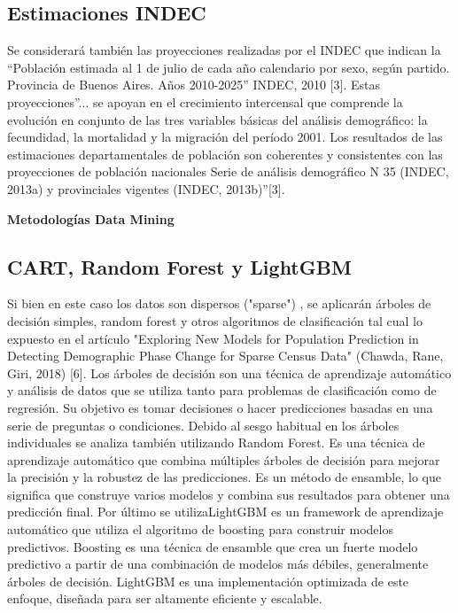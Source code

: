 \documentclass{article}
\theoremstyle{mytheoremstyle}
\theoremstyle{mytheoremstyle}
\theoremstyle{myproblemstyle}
\begin{document}
\subsection{Estimaciones INDEC}
 Se considerará también las proyecciones realizadas por el INDEC que indican la “Población estimada al 1 de julio de
 cada año calendario por sexo, según partido. Provincia de Buenos Aires. Años 2010-2025” INDEC, 2010 [3].\newline
  Estas proyecciones''... se apoyan en el crecimiento intercensal que comprende la evolución en conjunto
 de las tres variables básicas del análisis demográfico: la fecundidad, la mortalidad y la migración del período
 2001. Los resultados de las estimaciones departamentales de población son coherentes y consistentes
 con las proyecciones de población nacionales Serie de análisis demográfico N 35 (INDEC, 2013a) y
 provinciales vigentes (INDEC, 2013b)''[3].

\textbf{Metodologías Data Mining}

\subsection{CART, Random Forest  y LightGBM}
 Si bien en este caso los datos son dispersos ("sparse") , se aplicarán árboles de decisión simples, random forest y otros algoritmos de clasificación
 tal cual lo expuesto en el artículo "Exploring New Models for Population Prediction in Detecting Demographic
  Phase Change for Sparse Census Data" (Chawda, Rane, Giri, 2018) [6]. \newline
  Los árboles de decisión son una técnica de aprendizaje automático y análisis de datos que se utiliza tanto para problemas de clasificación como de regresión. Su objetivo es tomar decisiones o
  hacer predicciones basadas en una serie de preguntas o condiciones. Debido al sesgo habitual en los árboles individuales se analiza también
  utilizando Random Forest. Es una técnica de aprendizaje automático que combina múltiples árboles de
  decisión para mejorar la precisión y la robustez de las predicciones. Es un método de ensamble, lo 
  que significa que construye varios modelos y combina sus resultados para obtener una predicción final.\newline
  Por último se utilizaLightGBM es un framework de aprendizaje automático que utiliza el algoritmo de 
  boosting para construir modelos predictivos. Boosting es una técnica de ensamble que crea un fuerte modelo 
  predictivo a partir de una combinación de modelos más débiles, generalmente árboles de decisión. 
  LightGBM es una implementación optimizada de este enfoque, diseñada para ser altamente eficiente y escalable.
\end{document}
